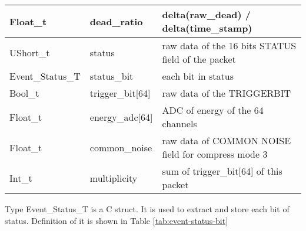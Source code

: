 \documentclass[a4paper, 12pt, onecolumn]{article}
\begin{document}
\begin{center}
\begin{supertabular}{| p{28mm} | p{25mm} | p{70mm} |}
    Float\_t           & dead\_ratio         & delta(raw\_dead) / delta(time\_stamp) \\\hline
    UShort\_t          & status              & raw data of the 16 bits STATUS field of the packet \\\hline
    Event\_Status\_T   & status\_bit         & each bit in status \\\hline
    Bool\_t            & trigger\_bit[64]    & raw data of the TRIGGERBIT \\\hline
    Float\_t           & energy\_adc[64]     & ADC of energy of the 64 channels \\\hline
    Float\_t           & common\_noise       & raw data of COMMON NOISE field for compress mode 3 \\\hline
    Int\_t             & multiplicity        & sum of trigger\_bit[64] of this packet \\
  \end{supertabular}
\end{center}

Type Event\_Status\_T is a C struct. It is used to extract and store each bit of status. Definition of it is shown in Table \ref{tab:event-status-bit}
\end{document}
